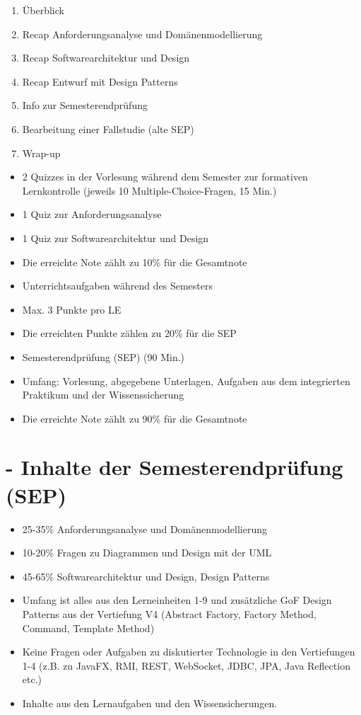 \documentclass[10pt]{article}
\begin{document}
\begin{enumerate}
  \item Überblick
  \item Recap Anforderungsanalyse und Domänenmodellierung
  \item Recap Softwarearchitektur und Design
  \item Recap Entwurf mit Design Patterns
  \item Info zur Semesterendprüfung
  \item Bearbeitung einer Fallstudie (alte SEP)
  \item Wrap-up
\end{enumerate}

\begin{itemize}
  \item 2 Quizzes in der Vorlesung während dem Semester zur formativen Lernkontrolle (jeweils 10 Multiple-Choice-Fragen, 15 Min.)
  \item 1 Quiz zur Anforderungsanalyse
  \item 1 Quiz zur Softwarearchitektur und Design
  \item Die erreichte Note zählt zu 10\% für die Gesamtnote
  \item Unterrichtsaufgaben während des Semesters
  \item Max. 3 Punkte pro LE
  \item Die erreichten Punkte zählen zu 20\% für die SEP
  \item Semesterendprüfung (SEP) (90 Min.)
  \item Umfang: Vorlesung, abgegebene Unterlagen, Aufgaben aus dem integrierten Praktikum und der Wissenssicherung
  \item Die erreichte Note zählt zu 90\% für die Gesamtnote
\end{itemize}

\section*{- Inhalte der Semesterendprüfung (SEP)}
\begin{itemize}
  \item 25-35\% Anforderungsanalyse und Domänenmodellierung
  \item 10-20\% Fragen zu Diagrammen und Design mit der UML
  \item 45-65\% Softwarearchitektur und Design, Design Patterns
  \item Umfang ist alles aus den Lerneinheiten 1-9 und zusätzliche GoF Design Patterns aus der Vertiefung V4 (Abstract Factory, Factory Method, Command, Template Method)
  \item Keine Fragen oder Aufgaben zu diskutierter Technologie in den Vertiefungen 1-4 (z.B. zu JavaFX, RMI, REST, WebSocket, JDBC, JPA, Java Reflection etc.)
  \item Inhalte aus den Lernaufgaben und den Wissensicherungen.
\end{itemize}
\end{document}
